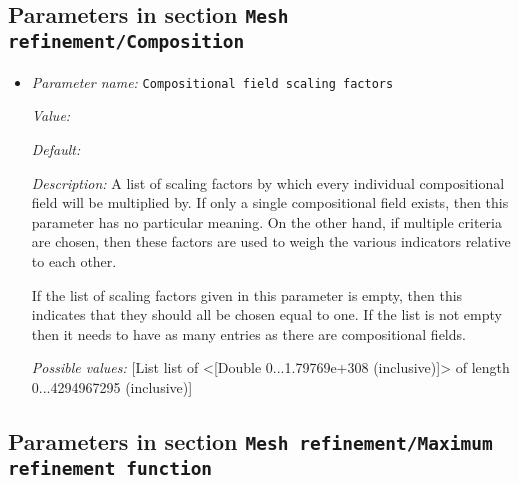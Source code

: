 \subsection{Parameters in section \tt Mesh refinement/Composition}
\label{parameters:Mesh_20refinement/Composition}

\begin{itemize}
\item {\it Parameter name:} {\tt Compositional field scaling factors}
\label{parameters:Mesh refinement/Composition/Compositional field scaling factors}


{\it Value:} 


{\it Default:} 


{\it Description:} A list of scaling factors by which every individual compositional field will be multiplied by. If only a single compositional field exists, then this parameter has no particular meaning. On the other hand, if multiple criteria are chosen, then these factors are used to weigh the various indicators relative to each other. 

If the list of scaling factors given in this parameter is empty, then this indicates that they should all be chosen equal to one. If the list is not empty then it needs to have as many entries as there are compositional fields.


{\it Possible values:} [List list of <[Double 0...1.79769e+308 (inclusive)]> of length 0...4294967295 (inclusive)]
\end{itemize}

\subsection{Parameters in section \tt Mesh refinement/Maximum refinement function}
\label{parameters:Mesh_20refinement/Maximum_20refinement_20function}

